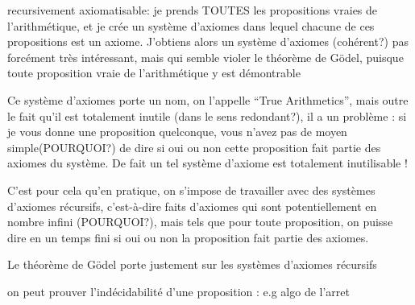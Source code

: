 recursivement axiomatisable:
je prends TOUTES les propositions vraies de l’arithmétique, et je crée un système d’axiomes dans lequel chacune de ces propositions est un axiome. J’obtiens alors un système d’axiomes (cohérent?) pas forcément très intéressant, mais qui semble violer le théorème de Gödel, puisque toute proposition vraie de l’arithmétique y est démontrable

Ce système d’axiomes porte un nom, on l’appelle “True Arithmetics”, mais outre le fait qu’il est totalement inutile (dans le sens redondant?), il a un problème : si je vous donne une proposition quelconque, vous n’avez pas de moyen simple(POURQUOI?) de dire si oui ou non cette proposition fait partie des axiomes du système. De fait un tel système d’axiome est totalement inutilisable !

C’est pour cela qu’en pratique, on s’impose de travailler avec des systèmes d’axiomes récursifs, c’est-à-dire faits d’axiomes qui sont potentiellement en nombre infini (POURQUOI?), mais tels que pour toute proposition, on puisse dire en un temps fini si oui ou non la proposition fait partie des axiomes.

Le théorème de Gödel porte justement sur les systèmes d’axiomes récursifs


on peut prouver l'indécidabilité d'une proposition : e.g algo de l'arret
